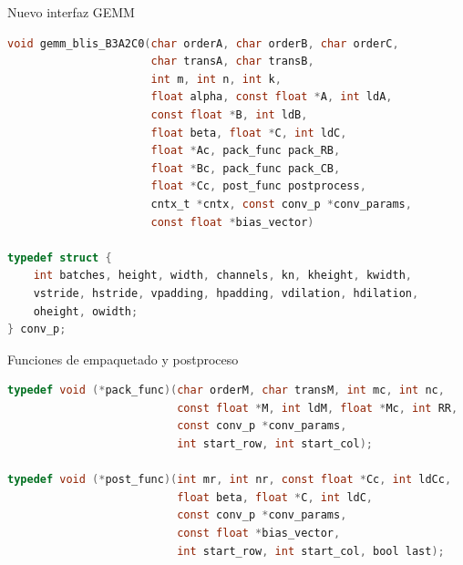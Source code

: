 \documentclass[aspectratio=43]{beamer}
\begin{document}
\begin{frame}%
\end{frame}

\begin{frame}[fragile]{Nuevo interfaz GEMM}
\begin{lstlisting}[language=C,basicstyle=\scriptsize\ttfamily]
void gemm_blis_B3A2C0(char orderA, char orderB, char orderC,
                      char transA, char transB,
                      int m, int n, int k,
                      float alpha, const float *A, int ldA,
                      const float *B, int ldB,
                      float beta, float *C, int ldC,
                      float *Ac, pack_func pack_RB,
                      float *Bc, pack_func pack_CB,
                      float *Cc, post_func postprocess,
                      cntx_t *cntx, const conv_p *conv_params,
                      const float *bias_vector)

typedef struct {
    int batches, height, width, channels, kn, kheight, kwidth,
    vstride, hstride, vpadding, hpadding, vdilation, hdilation,
    oheight, owidth;
} conv_p;
\end{lstlisting}
\end{frame}

\begin{frame}[fragile]{Funciones de empaquetado y postproceso}
\begin{lstlisting}[language=C,basicstyle=\scriptsize\ttfamily]
typedef void (*pack_func)(char orderM, char transM, int mc, int nc,
                          const float *M, int ldM, float *Mc, int RR,
                          const conv_p *conv_params,
                          int start_row, int start_col);

typedef void (*post_func)(int mr, int nr, const float *Cc, int ldCc,
                          float beta, float *C, int ldC,
                          const conv_p *conv_params,
                          const float *bias_vector,
                          int start_row, int start_col, bool last);
\end{lstlisting}
\end{frame}
\end{document}
